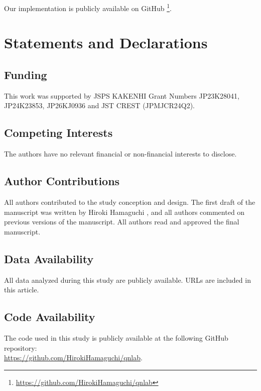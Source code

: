 \documentclass[smallextended]{svjour3}       %
\newenvironment{MPCchange}{%
    \ifdefined\MPCRevision\color{red}\fi
}{}
\newcommand{\MPCchanged}[1]{\begin{MPCchange}#1\end{MPCchange}}
\begin{document}
Our implementation is publicly available on GitHub%
\footnote{\label{fn:ourGitHub}\url{https://github.com/HirokiHamaguchi/qnlab}}.



\begin{appendices}
    
\end{appendices}

\clearpage



\section*{Statements and Declarations}

\subsection*{Funding}

This work was supported by JSPS KAKENHI Grant Numbers JP23K28041, JP24K23853, JP26KJ0936 and JST CREST (JPMJCR24Q2).

\subsection*{Competing Interests}

The authors have no relevant financial or non-financial interests to disclose.

\subsection*{Author Contributions}

All authors contributed to the study conception and design.
The first draft of the manuscript was written by Hiroki Hamaguchi\MPCchanged{,} and all authors commented on previous versions of the manuscript.
All authors read and approved the final manuscript.

\subsection*{Data Availability}

All data analyzed during this study are publicly available.
URLs are included in this article.

\subsection*{Code Availability}

The code used in this study is publicly available at the following GitHub repository: \\
\url{https://github.com/HirokiHamaguchi/qnlab}.
\end{document}
